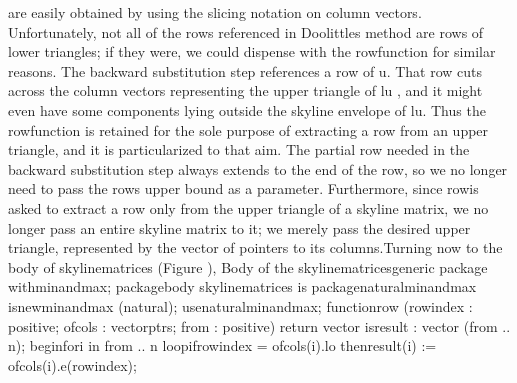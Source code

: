 are easily obtained by using the slicing notation on column vectors.
Unfortunately, not all of the rows referenced in Doolittle\rsquo[]s
method are rows of lower triangles; if they were, we could dispense
with the \tyxffmxmono[]row\tyxffmxendmono[] function for similar reasons.
The backward substitution step references a row of %
\tyxffmxmono[]u\tyxffmxendmono[]. That row cuts across the column
vectors representing the upper triangle of \tyxffmxmono[]lu%
\tyxffmxendmono[], and it might even have some components lying outside
the skyline envelope of \tyxffmxmono[]lu\tyxffmxendmono[]. Thus the
\tyxffmxmono[]row\tyxffmxendmono[] function is retained for the sole
purpose of extracting a row from an upper triangle, and it is particularized
to that aim. The partial row needed in the backward substitution step
always extends to the end of the row, so we no longer need to pass
the row\rsquo[]s upper bound as a parameter. Furthermore, since %
\tyxffmxmono[]row\tyxffmxendmono[] is asked to extract a row only
from the upper triangle of a skyline matrix, we no longer pass an
entire skyline matrix to it; we merely pass the desired upper triangle,
represented by the vector of pointers to its columns.\Endpara[]
\Para[]Turning now to the body of \tyxffmxmono[]skyline\Symuns[]matrices%
\tyxffmxendmono[] (Figure ),
\FgBlock[]
\Parbox[]
Body of the %
\tyxffmxmono[]skyline\Symuns[]matrices\tyxffmxendmono[] generic package%
\FgEndcap[]
\Comp[]\tyxtstxbf[]with\tyxtstxendbf[] min\Symuns[]and\Symuns[]max;
\tyxtstxbf[]package\tyxtstxendbf[] \tyxtstxbf[]body%
\tyxtstxendbf[] skyline\Symuns[]matrices \tyxtstxbf[]is%
\tyxtstxendbf[]
   \tyxtstxbf[]package\tyxtstxendbf[] natural\Symuns[]min\Symuns[]and\Symuns[]max %
\tyxtstxbf[]is\tyxtstxendbf[] \tyxtstxbf[]new\tyxtstxendbf[] min\Symuns[]and\Symuns[]max (natural);
   \tyxtstxbf[]use\tyxtstxendbf[]     natural\Symuns[]min\Symuns[]and\Symuns[]max;
   \tyxtstxbf[]function\tyxtstxendbf[] row (row\Symuns[]index : positive;
                 of\Symuns[]cols   : vector\Symuns[]ptrs;
                 from      : positive) \tyxtstxbf[]return%
\tyxtstxendbf[] vector \tyxtstxbf[]is\tyxtstxendbf[]
      result : vector (from .. n);
   \tyxtstxbf[]begin\tyxtstxendbf[]
      \tyxtstxbf[]for\tyxtstxendbf[] i \tyxtstxbf[]in%
\tyxtstxendbf[] from .. n \tyxtstxbf[]loop\tyxtstxendbf[]
         \tyxtstxbf[]if\tyxtstxendbf[] row\Symuns[]index \Symgt[]= of\Symuns[]cols(i).lo %
\tyxtstxbf[]then\tyxtstxendbf[]
            result(i) := of\Symuns[]cols(i).e(row\Symuns[]index);
